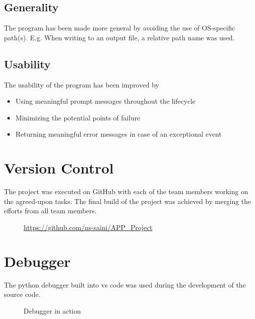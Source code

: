  \subsection{Generality}
    \begin{flushleft}
      The program has been made more general by avoiding the use of OS-specific path(s). E.g. When writing to an output file, a relative path name was used.
    \end{flushleft}

    \subsection{Usability}
    \begin{flushleft}
      The usability of the program has been improved by 
      \begin{itemize}
        \item {Using meaningful prompt messages throughout the lifecycle }
        \item {Minimizing the potential points of failure }
        \item {Returning meaningful error messages in case of an exceptional event}
      \end{itemize}
    \end{flushleft}
  
  \section{Version Control}
    The project was executed on GitHub with each of the team members working on the agreed-upon tasks. The final build of the project was achieved by merging the efforts from all team members.
    
    \begin{figure}[h!]
      \centering
      \caption{\url{https://github.com/ns-saini/APP_Project}}
      \label{fig:Repository}
    \end{figure}

  \pagebreak
  \section{Debugger}
    The python debugger built into vs code was used during the development of the source code.
    \begin{figure}[h!]
      \centering
      \caption{Debugger in action}
      \label{fig:Debugger}
    \end{figure}

